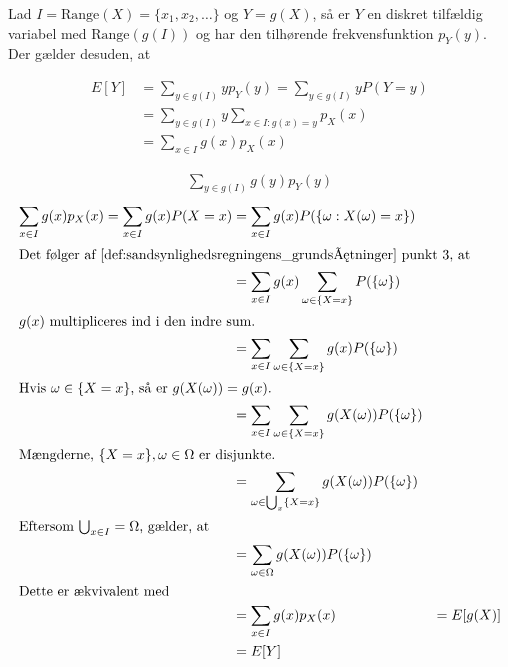 \begin{bev}\textbf{} %
\newline
Lad $I= \text{Range}(X)=\{x_1,x_2,\dots\}$ og $Y=g(X)$, så er $Y$ en diskret tilfældig variabel med $\text{Range}\left(g(I)\right)$ og har den tilhørende frekvensfunktion $p_Y(y)$. Der gælder desuden, at




 \begin{align*}
     E[Y]&=\sum_{y \in g(I)} y p_Y(y) = \sum_{y \in g(I)} y P(Y=y)\\
     &=\sum_{y \in g(I)} y\sum_{x\in I:g(x)=y} p_X(x)\\
     &=\sum_{x \in I} g(x)p_X(x)
 \end{align*}
 
 \begin{align*}
     \sum_{y\in g(I)} g(y)p_Y(y)
 \end{align*}
\pagebreak
\begin{align*}
    \sum_{x\in I}g(x)p_X(x)=\sum_{x\in I}g(x)P(X=x)&=\sum_{x\in I} g(x) P(\{\omega: X(\omega)=x\})\\
\intertext{Det følger af \autoref{def:sandsynlighedsregningens_grundsætninger} punkt 3, at}
    &=\sum_{x\in I} g(x)\sum_{\omega\in \{X=x\}} P(\{\omega\})\\
\intertext{$g(x)$ multipliceres ind i den indre sum.}
    &=\sum_{x\in I}\sum_{\omega\in\{X=x\}}g(x)P(\{\omega\})\\
\intertext{Hvis $\omega\in\{X=x\}$, så er $g(X(\omega))=g(x)$.}
    &=\sum_{x\in I} \sum_{\omega\in\{X=x\}} g(X(\omega))P(\{\omega\})\\
\intertext{Mængderne, $\{X=x\}, \omega\in \Omega$ er disjunkte.} 
    &=\sum_{\omega\in\bigcup_x\{X=x\}} g(X(\omega))P(\{\omega\})\\
\intertext{Eftersom $\bigcup_{x\in I}=\Omega$, gælder, at}
    &=\sum_{\omega\in\Omega} g(X(\omega))P(\{\omega\})\\
\intertext{Dette er ækvivalent med}
    &=\sum_{x\in I}g(x)p_X(x)
    &=E[g(X)]\\
    &=E[Y]
\end{align*}


\end{bev}
